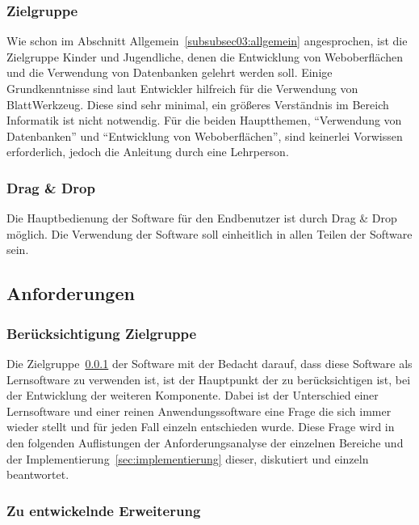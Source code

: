 \subsubsection{Zielgruppe}
\label{subsubsec03:zielgruppe}

Wie schon im Abschnitt Allgemein~\ref{subsubsec03:allgemein} angesprochen, ist die Zielgruppe Kinder und Jugendliche, denen die Entwicklung von Weboberflächen und die Verwendung von Datenbanken gelehrt werden soll. Einige Grundkenntnisse sind laut Entwickler hilfreich für die Verwendung von BlattWerkzeug. Diese sind sehr minimal, ein größeres Verständnis im Bereich Informatik ist nicht notwendig. Für die beiden Hauptthemen, ``Verwendung von Datenbanken'' und ``Entwicklung von Weboberflächen'', sind keinerlei Vorwissen erforderlich, jedoch die Anleitung durch eine Lehrperson. 

\subsubsection{Drag \& Drop}
\label{subsubsec03:dragAndDrop}

Die Hauptbedienung der Software für den Endbenutzer ist durch Drag \& Drop möglich. Die Verwendung der Software soll einheitlich in allen Teilen der Software sein.

\subsection{Anforderungen}
\label{subsec03:was_benoetigt}

\subsubsection{Berücksichtigung Zielgruppe}
\label{subsubsec03:zielgruppe_beruecksichtigung}

Die Zielgruppe~\ref{subsubsec03:zielgruppe} der Software mit der Bedacht darauf, dass diese Software als Lernsoftware zu verwenden ist, ist der Hauptpunkt der zu berücksichtigen ist, bei der Entwicklung der weiteren Komponente.
Dabei ist der Unterschied einer Lernsoftware und einer reinen Anwendungssoftware eine Frage die sich immer wieder stellt und für jeden Fall einzeln entschieden wurde. Diese Frage wird in den folgenden Auflistungen der Anforderungsanalyse der einzelnen Bereiche und der Implementierung~\ref{sec:implementierung} dieser, diskutiert und einzeln beantwortet.

\subsubsection{Zu entwickelnde Erweiterung}
\label{subsubsec03:zu_entwickeln}


